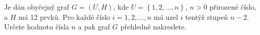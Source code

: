 Je dán obyčejný graf $G=(U,H)$, kde $U=\left \{ 1,2,\dots,n \right \}$, $n>0$
přirozené číslo, a $H$ má 12 prvků. Pro každé číslo $i=1,2,\dots,n$ má uzel $i$
tentýž stupeň $n-2$. Určete hodnotu čísla $n$ a pak graf $G$ přehledně
nakreslete.
